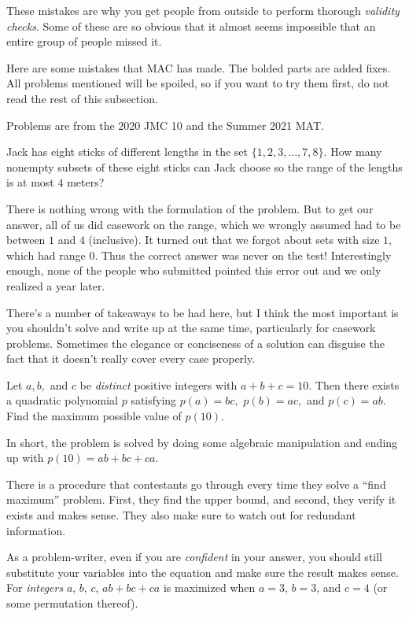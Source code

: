 \documentclass[points=false]{bounce}
\begin{document}
These mistakes are why you get people from outside to perform thorough \emph{validity checks}. Some of these are so obvious that it almost seems impossible that an entire group of people missed it.

Here are some mistakes that MAC has made. The bolded parts are added fixes. All problems mentioned will be spoiled, so if you want to try them first, do not read the rest of this subsection.

Problems are from the 2020 JMC 10 and the Summer 2021 MAT.

\begin{exam}[JMC 2020/11]
    Jack has eight sticks of different lengths in the set $\{1,2,3,\dots,7,8\}$. How many nonempty subsets of these eight sticks can Jack choose so the range of the lengths is at most $4$ meters?
\end{exam}

There is nothing wrong with the formulation of the problem. But to get our answer, all of us did casework on the range, which we wrongly assumed had to be between $1$ and $4$ (inclusive). It turned out that we forgot about sets with size $1$, which had range $0$. Thus the correct answer was never on the test! Interestingly enough, none of the people who submitted pointed this error out and we only realized a year later.

There's a number of takeaways to be had here, but I think the most important is you shouldn't solve and write up at the same time, particularly for casework problems. Sometimes the elegance or conciseness of a solution can disguise the fact that it doesn't really cover every case properly.

\begin{exam}[MAT 2021/5]
    Let $a, b,$ and $c$ be \emph{distinct} positive integers with $a + b + c = 10.$ Then there exists a quadratic polynomial $p$ satisfying $p(a) = bc,$ $p(b) = ac,$ and $p(c) = ab.$ Find the maximum possible value of $p(10).$
\end{exam}

In short, the problem is solved by doing some algebraic manipulation and ending up with $p(10)=ab+bc+ca$.

There is a procedure that contestants go through every time they solve a ``find maximum'' problem. First, they find the upper bound, and second, they verify it exists and makes sense. They also make sure to watch out for redundant information.

As a problem-writer, even if you are \emph{confident} in your answer, you should still substitute your variables into the equation and make sure the result makes sense. For \emph{integers} $a$, $b$, $c$, $ab+bc+ca$ is maximized when $a=3$, $b=3$, and $c=4$ (or some permutation thereof).
\end{document}
